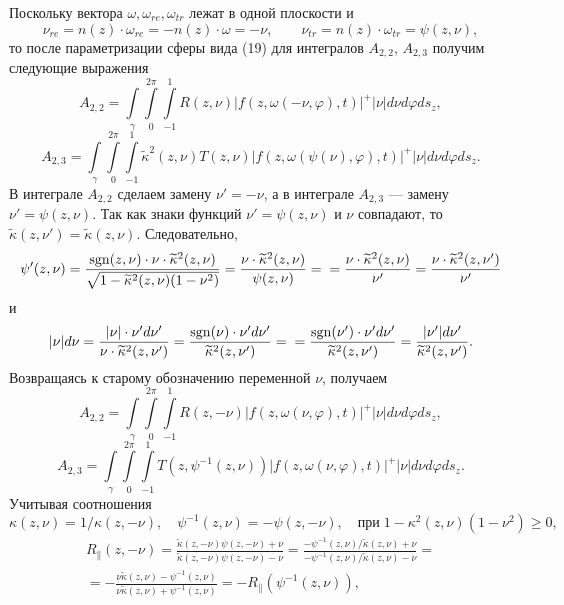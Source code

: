 \documentclass[12pt,reqno]{report}
\def\sgn{\mathrm{sgn}}
\begin{document}
Поскольку вектора $\omega,\omega_{re},\omega_{tr}$ лежат в
одной плоскости и 
$$
\nu_{re}=n(z) \cdot \omega_{re} = - n(z) \cdot \omega
=-\nu,\qquad \nu_{tr}=n(z)\cdot\omega_{tr}=\psi(z,\nu),
$$
то после параметризации сферы вида (19) для интегралов $A_{2,2}$,  $A_{2,3}$ получим следующие выражения
$$
 A_{2,2}= \int \limits_{\gamma} \int
\limits^{2\pi}_{0} \int \limits^{1}_{-1} R(z,\nu)
|f(z,\omega(-\nu,\varphi),t)|^+ |\nu| d \nu d \varphi  d s_z,
$$
$$
 A_{2,3} = \int \limits_{\gamma}
 \int
\limits^{2\pi}_{0} \int \limits^{1}_{-1} \widetilde{\kappa}^2(z,\nu )
T(z,\nu) |f(z,\omega(\psi(\nu),\varphi),t)|^+ |\nu| d \nu d
\varphi  d s_z.
$$
В интеграле $ A_{2,2}$  сделаем замену $\nu'=-\nu$, а в интеграле $A_{2,3}$ --- замену $\nu'=\psi(z,\nu)$.
Так как знаки функций $\nu'=\psi(z,\nu)$ и $\nu$ совпадают, то
$\widetilde{\kappa}(z,\nu')=\widetilde{\kappa}(z,\nu)$. Следовательно,
$$
\psi'(z,\nu)=\dfrac{{\sgn}(z,\nu) \cdot \nu\cdot
	\widetilde{\kappa}^2(z,\nu)}{\sqrt{1-\widetilde{\kappa}^2(z,\nu)(1-\nu^2)}}
= \dfrac{ \nu \cdot\widetilde{\kappa}^2(z,\nu)}{\psi(z,\nu)} = \\=  \dfrac{
	\nu \cdot\widetilde{\kappa}^2(z,\nu)}{\nu'}= \dfrac{ \nu
	\cdot\widetilde{\kappa}^2(z,\nu')}{\nu'}
$$
и
$$
|\nu|d\nu= \frac{|\nu| \cdot \nu'
	d\nu'}{\nu\cdot\widetilde{\kappa}^2(z,\nu')} = \frac{{\sgn}(\nu)
	\cdot \nu' d\nu'}{\widetilde{\kappa}^2(z,\nu')}= \\= \frac{{\sgn}(\nu')
	\cdot \nu' d\nu'}{\widetilde{\kappa}^2(z,\nu')}= \frac{|\nu'|
	d\nu'}{\widetilde{\kappa}^2(z,\nu')} .
$$
Возвращаясь  к старому обозначению переменной $\nu$,
получаем
$$
A_{2,2}= \int \limits_{\gamma} \int
\limits^{2\pi}_{0} \int \limits^{1}_{-1} R(z,-\nu)
|f(z,\omega(\nu,\varphi),t)|^+ |\nu| d \nu d \varphi  d s_z,
$$
$$
A_{2,3} = \int \limits_{\gamma}
\int
\limits^{2\pi}_{0} \int \limits^{1}_{-1} 
T(z,\psi^{-1}(z,\nu)) |f(z,\omega(\nu,\varphi),t)|^+ |\nu| d \nu d
\varphi  d s_z.
$$
Учитывая соотношения
$$
\kappa(z,\nu)=1/\kappa(z,-\nu), \quad \psi^{-1}(z,\nu)=-\psi(z,-\nu),
\quad \text{при} \; 1-\kappa^2(z,\nu)(1-\nu^2) \geq 0,
$$
\begin{multline}
R_{\|}(z,-\nu)=\frac{\widetilde{\kappa}(z,-\nu)
	\psi(z,-\nu)+\nu}{\widetilde{\kappa}(z,-\nu) \psi(z,-\nu)-\nu}= \frac{
	-\psi^{-1}(z,\nu)/\widetilde{\kappa}(z,\nu)+\nu}{-\psi^{-1}(z,\nu)/\widetilde{\kappa}(z,\nu)
	-\nu}= \\ =-\frac{\nu \widetilde{\kappa}(z,\nu) - \psi^{-1}(z,\nu)}
{\nu\widetilde{\kappa}(z,\nu) + \psi^{-1}(z,\nu)}=
-R_{\|}(\psi^{-1}(z,\nu)), \nonumber
\end{multline}
\end{document}

